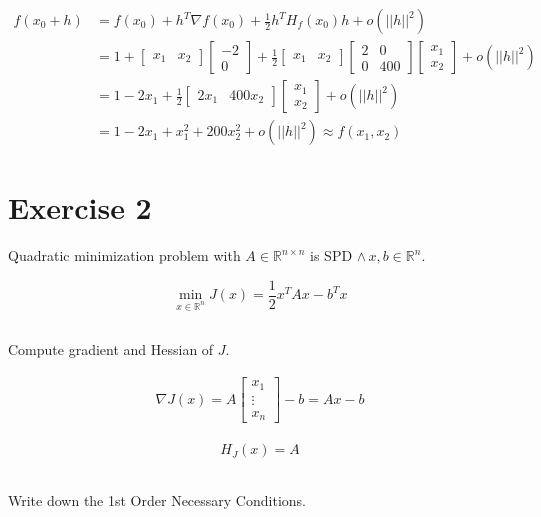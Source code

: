 \documentclass[unicode,11pt,a4paper,oneside,numbers=endperiod,openany]{scrartcl}
\newcommand{\myvec}[1]{\begin{bmatrix} #1 \end{bmatrix}}
\newcommand{\myex}[1]{\begin{equation*}\begin{aligned} #1 \end{aligned}\end{equation*}}
\begin{document}
\begin{equation*}
\begin{aligned}
    f(x_0 + h)
     & = f(x_0) + h^T \nabla f(x_0) + \frac{1}{2} h^T H_f(x_0) h + o(|| h ||^2)                                                                                                                                                                                                                                                                                      \\
     & = 1 + \myvec{x_1 & x_2} \myvec{-2 \\ 0 } + \frac{1}{2} \myvec{x_1 & x_2} \myvec{2 & 0 \\ 0 & 400} \myvec{x_1 \\ x_2} + o(|| h ||^2) \\
     & = 1 - 2x_1 + \frac{1}{2} \myvec{2x_1 & 400x_2} \myvec{x_1 \\ x_2} + o(|| h ||^2) \\ 
     & = 1 - 2x_1 + x_1^2 + 200x_2^2 + o(|| h ||^2) \approx f(x_1, x_2)
\end{aligned}
\end{equation*}

\section{Exercise 2}
Quadratic minimization problem with $A \in \mathbb{R}^{n \times n}$ is SPD 
$\land \, x,b \in \mathbb{R}^n$.

\begin{equation}
    \min_{x \in \mathbb{R}^n} J(x) = \frac{1}{2} x^T A x - b^T x
\end{equation}

\subsection{}
Compute gradient and Hessian of $J$. \newline

\myex{
    \nabla J(x) = A \myvec{x_1 \\ \vdots \\ x_n} - b = Ax - b
}

\myex{
    H_J(x) = A
}

\subsection{}
Write down the 1st Order Necessary Conditions. \newline
\end{document}
